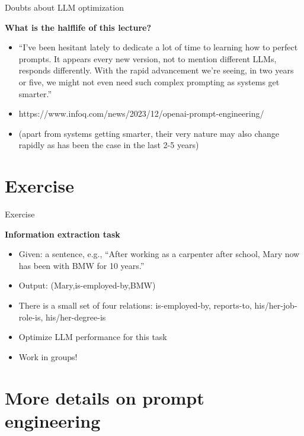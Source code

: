 \documentclass[11pt,compress,t,notes=noshow, xcolor=table]{beamer}
\begin{document}
\begin{vbframe}{Doubts about LLM optimization}

\vfill

\textbf{What is the halflife of this lecture?}

	\begin{itemize}
		\item ``I've been hesitant lately to dedicate a lot of time to
learning how to perfect prompts. It appears every new
version, not to mention different LLMs, responds
differently. With the rapid advancement we're seeing, in two
years or five, we might not even need such complex prompting
as systems get smarter.''
\item https://www.infoq.com/news/2023/12/openai-prompt-engineering/
\item (apart from systems getting smarter, their very nature
may also change rapidly as has been the case in the last 2-5
		years)
	\end{itemize}

\vfill

\end{vbframe}



\section{Exercise}

\begin{vbframe}{Exercise}

\vfill

\textbf{Information extraction task}

\begin{itemize}
                \item Given: a sentence, e.g., ``After
                working as a carpenter after school, Mary now has
                been with BMW for 10 years.''
\item Output: (Mary,is-employed-by,BMW)
\item There is a small set of four relations: is-employed-by,
                reports-to,
                his/her-job-role-is, his/her-degree-is
\item Optimize LLM performance for this task
\item Work in groups!

\end{itemize}

\vfill

\end{vbframe}




\section{More details on prompt engineering}

\begin{vbframe}{}

\vfill


\href{https://platform.openai.com/docs/guides/prompt-engineering}{}



\vfill

\end{vbframe}


\endlecture
\end{document}
